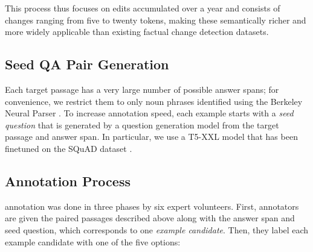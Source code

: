 This process thus focuses on edits accumulated over a year and consists of changes ranging from five to twenty tokens, making these semantically richer and more widely applicable than existing factual change detection datasets.

\subsection{Seed QA Pair Generation}\label{sec:seed}
Each target passage has a very large number of possible answer spans; for convenience, we restrict them to only noun phrases identified using the Berkeley Neural Parser \citep{kitaev-klein-2018-constituency}. 
To increase annotation speed, each example starts with a \textit{seed question} that is generated by a question generation model from the target passage and answer span. In particular, we use a T5-XXL model \citep{raffel2020exploring} that has been finetuned on the SQuAD dataset \cite{rajpurkar-etal-2016-Squad}.



\subsection{Annotation Process}
\dataset{} annotation was done in three phases by six expert volunteers. First, annotators are given the paired passages described above along with the answer span and seed question, which corresponds to one \textit{example candidate}. Then, they label each example candidate with one of the five options:

